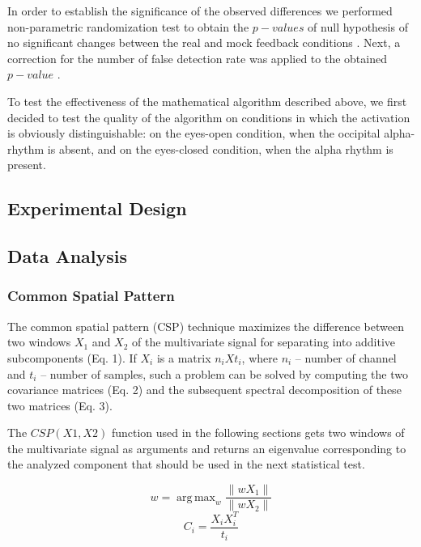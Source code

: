 \documentclass[14pt,a4paper]{scrartcl}
\DeclareMathOperator*{\argmax}{arg\,max}
\begin{document}
In order to establish the significance of the observed differences we performed non-parametric randomization test to obtain the $p-values$ of null hypothesis of no significant changes between the real and mock feedback conditions \cite{Maris2007}. Next, a correction for the number of false detection rate was applied to the obtained $p-value$ \cite{Benjamini2001}.

To test the effectiveness of the mathematical algorithm described above, we first decided to test the quality of the algorithm on conditions in which the activation is obviously distinguishable: on the eyes-open condition, when the occipital alpha-rhythm is absent, and on the eyes-closed condition, when the alpha rhythm is present.

\subsection{Experimental Design}
\label{sec:Methods:Experimental Design}

\subsection{Data Analysis}
\label{sec:Methods:Data Analysis}

\subsubsection{Common Spatial Pattern}
\label{sec:Methods:Data Analysis:Common Spatial Pattern}

The common spatial pattern (CSP) technique maximizes the difference between two windows $X_{1}$ and $X_{2}$ of the multivariate signal for separating into additive subcomponents (Eq. 1). If $X_{i}$ is a matrix $n_{i} X t_{i}$, where $n_{i}$ – number of channel and $t_{i}$ – number of samples, such a problem can be solved by computing the two covariance matrices (Eq. 2) and the subsequent spectral decomposition of these two matrices (Eq. 3).

The $CSP(X1, X2)$ function used in the following sections gets two windows of the multivariate signal as arguments and returns an eigenvalue corresponding to the analyzed component that should be used in the next statistical test.

\begin{equation}
w = \argmax_{w}{\frac{\left \| wX_{1} \right \|}{\left \| wX_{2} \right \|}}
\end{equation}
\begin{equation}
C_{i} = \frac{X_{i}X^{T}_{i}}{t_{i}}
\end{equation}
\end{document}
